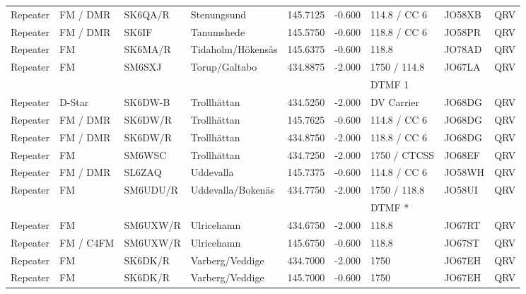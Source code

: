 \begin{longtable}{llllrrlll}
Repeater & FM / DMR  & SK6QA/R  & Stenungsund       & 145.7125     & -0.600     & 114.8 / CC 6 & JO58XB      & QRV      \\
Repeater & FM / DMR  & SK6IF    & Tanumshede        & 145.5750     & -0.600     & 118.8 / CC 6 & JO58PR      & QRV      \\
Repeater & FM        & SK6MA/R  & Tidaholm/Hökensås & 145.6375     & -0.600     & 118.8        & JO78AD      & QRV      \\
Repeater & FM        & SM6SXJ   & Torup/Galtabo     & 434.8875     & -2.000     & 1750 / 114.8 & JO67LA      & QRV      \\
         &           &          &                   &              &            & DTMF 1       &             &          \\
Repeater & D-Star    & SK6DW-B  & Trollhättan       & 434.5250     & -2.000     & DV Carrier   & JO68DG      & QRV      \\
Repeater & FM / DMR  & SK6DW/R  & Trollhättan       & 145.7625     & -0.600     & 114.8 / CC 6 & JO68DG      & QRV      \\
Repeater & FM / DMR  & SK6DW/R  & Trollhättan       & 434.8750     & -2.000     & 118.8 / CC 6 & JO68DG      & QRV      \\
Repeater & FM        & SM6WSC   & Trollhättan       & 434.7250     & -2.000     & 1750 / CTCSS & JO68EF      & QRV      \\
Repeater & FM / DMR  & SL6ZAQ   & Uddevalla         & 145.7375     & -0.600     & 114.8 / CC 6 & JO58WH      & QRV      \\
Repeater & FM        & SM6UDU/R & Uddevalla/Bokenäs & 434.7750     & -2.000     & 1750 / 118.8 & JO58UI      & QRV      \\
         &           &          &                   &              &            & DTMF *       &             &          \\
Repeater & FM        & SM6UXW/R & Ulricehamn        & 434.6750     & -2.000     & 118.8        & JO67RT      & QRV      \\
Repeater & FM / C4FM & SM6UXW/R & Ulricehamn        & 145.6750     & -0.600     & 118.8        & JO67ST      & QRV      \\
Repeater & FM        & SK6DK/R  & Varberg/Veddige   & 434.7000     & -2.000     & 1750         & JO67EH      & QRV      \\
Repeater & FM        & SK6DK/R  & Varberg/Veddige   & 145.7000     & -0.600     & 1750         & JO67EH      & QRV      \\

\end{longtable}
